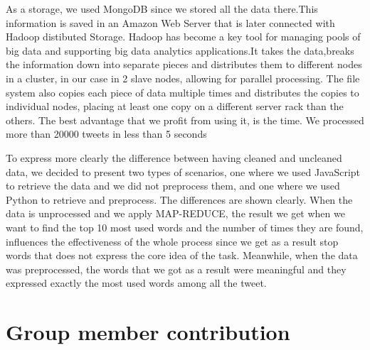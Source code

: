 \documentclass{article}
\begin{document}
 As a storage, we used MongoDB since we stored all the data there.This information is saved in an Amazon Web Server that is later connected with Hadoop distibuted Storage. Hadoop has become a key tool for managing pools of big data and supporting big data analytics applications.It takes the data,breaks the information down into separate pieces and distributes them to different nodes in a cluster, in our case in 2 slave nodes, allowing for parallel processing. The file system also copies each piece of data multiple times and distributes the copies to individual nodes, placing at least one copy on a different server rack than the others. The best advantage that we profit from using it, is the time. We processed more than 20000 tweets in less than 5 seconds

To express more clearly the difference between having cleaned and uncleaned data, we decided to present two types of scenarios, one where we used JavaScript to retrieve the data and we did not preprocess them, and one where we used Python to retrieve and preprocess. The differences are shown clearly. When the data is unprocessed and we apply MAP-REDUCE, the result we get when we want to find the top 10 most used words and the number of times they are found, influences the effectiveness of the whole process since we get as a result stop words that does not express the core idea of the task. Meanwhile, when the data was preprocessed, the words that we got as a result were meaningful and they expressed exactly the most used words among all the tweet.

 \section{Group member contribution}
 
    
    
    \nocite{*}
\end{document}
